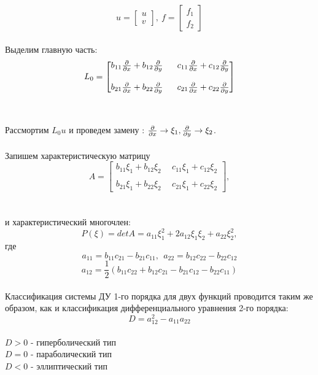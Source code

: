 \documentclass[../main.tex]{subfiles}
\begin{document}
$$u = \begin{bmatrix}
		u \\ v
	\end{bmatrix}, \  f = \begin{bmatrix}
		f_1 \\ f_2
	\end{bmatrix}$$ \\
Выделим главную часть: \\
$$
	L_0 = \begin{bmatrix}
		b_{11}\pderiv{}{x} + b_{12}\pderiv{}{y} \  & \ c_{11}\pderiv{}{x} + c_{12}\pderiv{}{y} \\ \\
		b_{21}\pderiv{}{x} + b_{22}\pderiv{}{y} \  & \ c_{21}\pderiv{}{x} + c_{22}\pderiv{}{y}
	\end{bmatrix}
$$ \\ \\
Рассмортим $L_0u$ и проведем замену : $\frac{\partial }{\partial x} \rightarrow \xi_1, \frac{\partial }{\partial y} \rightarrow \xi_2$. \\
\\ Запишем характеристическую матрицу
$$
	A = \begin{bmatrix}
		b_{11}\xi_1 + b_{12}\xi_2 \  & \ c_{11}\xi_1 + c_{12}\xi_2 \\ \\
		b_{21}\xi_1 + b_{22}\xi_2 \  & \ c_{21}\xi_1 + c_{22}\xi_2
	\end{bmatrix},
$$ \\ \\
и характеристический многочлен:\\
$$P(\xi) = detA = a_{11}\xi_1^2 + 2a_{12}\xi_1\xi_2+a_{22}\xi_2^2,$$
где
$$a_{11} = b_{11}c_{21} - b_{21}c_{11}, \ \
	a_{22} = b_{12}c_{22} - b_{22}c_{12}$$
$$a_{12} = \frac{1}{2}(b_{11}c_{22} + b_{12}c_{21} - b_{21}c_{12} - b_{22}c_{11})$$ \\
Классификация системы ДУ 1-го порядка для двух функций проводится таким же образом, как и классификация дифференциального уравнения 2-го порядка:
\\$$D = a_{12}^2 - a_{11}a_{22} $$ \\
$D > 0$ - гиперболический тип \\
$D = 0$ - параболический тип \\
$D < 0$ - эллиптический тип \\
\\
\\
\end{document}
